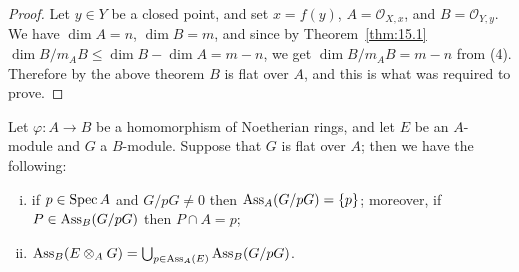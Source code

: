 \begin{proof}
Let $y \in Y$ be a closed point, and set $x = f(y)$, $A = \mathcal{O}_{X,x}$, and
$B = \mathcal{O}_{Y,y}$. We have $\dim A = n$, $\dim B = m$, and since by
Theorem~\ref{thm:15.1} $\dim B/m_AB \le \dim B - \dim A = m - n$, we get
$\dim B/m_AB = m - n$ from (4). Therefore by the above theorem $B$ is flat over $A$,
and this is what was required to prove.
\end{proof}

\begin{theorem}\label{thm:23.2}
Let $\varphi\colon A \to B$ be a homomorphism of Noetherian rings, and let $E$ be an
$A$-module and $G$ a $B$-module. Suppose that $G$ is flat over $A$; then we have
the following:
\begin{enumerate}[(i)]
  \item if $p \in \operatorname{Spec} A$ and $G/pG \neq 0$ then $\operatorname{Ass}_A(G/pG) = \{p\}$; moreover, if
        $P \in \operatorname{Ass}_B(G/pG)$ then $P \cap A = p$;
  \item $\operatorname{Ass}_B(E \otimes_A G) = \bigcup_{p \in \operatorname{Ass}_A(E)} \operatorname{Ass}_B(G/pG)$.
\end{enumerate}
\end{theorem}


